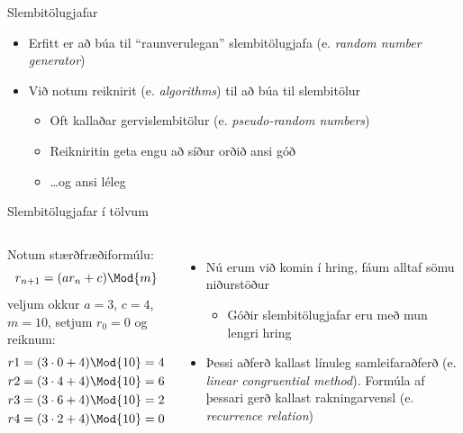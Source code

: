 \documentclass{beamer}
\begin{document}
\begin{frame}{Slembitölugjafar}
\begin{itemize}
 \item Erfitt er að búa til ``raunverulegan'' slembitölugjafa (e. \emph{random number generator})
 \item Við notum reiknirit (e. \emph{algorithms}) til að búa til slembitölur
 \begin{itemize}
  \item Oft kallaðar gervislembitölur (e. \emph{pseudo-random numbers})
  \item Reikniritin geta engu að síður orðið ansi góð \pause
  \item \ldots og ansi léleg
 \end{itemize}
\end{itemize}
\end{frame}

\begin{frame}{Slembitölugjafar í tölvum}
\begin{columns}
Notum stærðfræðiformúlu:
\[
r_{n+1} = (ar_n + c) \Mod{m}
\]
veljum okkur $a=3$, $c=4$, $m=10$, setjum $r_0 = 0$ og reiknum:
\begin{align*}
r1 = (3 \cdot 0 + 4) \Mod{10}  &=  4\\
r2 = (3 \cdot 4 + 4) \Mod{10}  &=  6\\
r3 = (3 \cdot 6 + 4) \Mod{10}  &=  2\\
r4 = (3 \cdot 2 + 4) \Mod{10}  &=  0\\
\end{align*}
\begin{itemize}
\item Nú erum við komin í hring, fáum alltaf sömu niðurstöður
 \begin{itemize}
  \item Góðir slembitölugjafar eru með mun lengri hring
 \end{itemize}
 \item Þessi aðferð kallast línuleg samleifaraðferð (e. \emph{linear congruential method}). Formúla af þessari gerð kallast rakningarvensl (e. \emph{recurrence relation})
\end{itemize}
\end{columns}
\end{frame}
\end{document}
